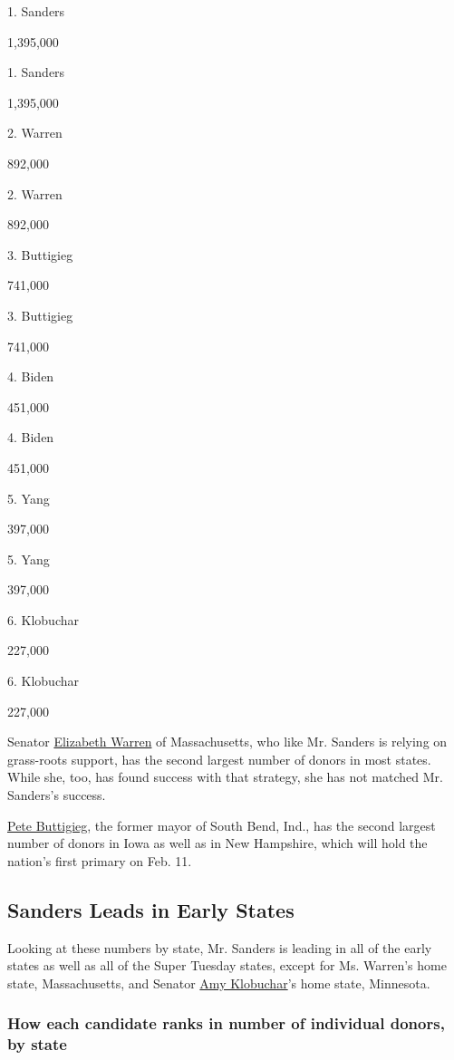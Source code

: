 1. Sanders

1,395,000

1. Sanders

1,395,000

2. Warren

892,000

2. Warren

892,000

3. Buttigieg

741,000

3. Buttigieg

741,000

4. Biden

451,000

4. Biden

451,000

5. Yang

397,000

5. Yang

397,000

6. Klobuchar

227,000

6. Klobuchar

227,000

Senator
\href{https://www.nytimes.com/interactive/2020/us/elections/elizabeth-warren.html}{Elizabeth
Warren} of Massachusetts, who like Mr. Sanders is relying on grass-roots
support, has the second largest number of donors in most states. While
she, too, has found success with that strategy, she has not matched Mr.
Sanders's success.

\href{https://www.nytimes.com/interactive/2020/us/elections/pete-buttigieg.html}{Pete
Buttigieg}, the former mayor of South Bend, Ind., has the second largest
number of donors in Iowa as well as in New Hampshire, which will hold
the nation's first primary on Feb. 11.

\hypertarget{sanders-leads-in-early-states}{%
\subsection{Sanders Leads in Early
States}\label{sanders-leads-in-early-states}}

Looking at these numbers by state, Mr. Sanders is leading in all of the
early states as well as all of the Super Tuesday states, except for Ms.
Warren's home state, Massachusetts, and Senator
\href{https://www.nytimes.com/interactive/2020/us/elections/amy-klobuchar.html}{Amy
Klobuchar}'s home state, Minnesota.

\hypertarget{how-each-candidate-ranks-in-number-of-individual-donors-by-state}{%
\subsubsection{How each candidate ranks in number of individual donors,
by
state}\label{how-each-candidate-ranks-in-number-of-individual-donors-by-state}}

